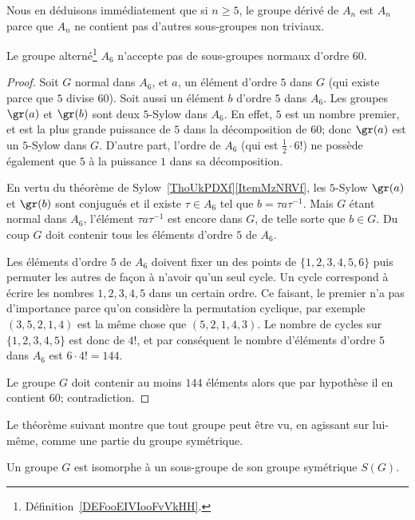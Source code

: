Nous en déduisons immédiatement que si \( n\geq 5\), le groupe dérivé de \( A_n\) est \( A_n\) parce que \( A_n\) ne contient pas d'autres sous-groupes non triviaux.

\begin{lemma}       \label{LEMooICEHooGSSpkq}
	Le groupe alterné\footnote{Définition~\ref{DEFooEIVIooFvVkHH}.} \( A_6\) n'accepte pas de sous-groupes normaux d'ordre \( 60\).
\end{lemma}

\begin{proof}
	Soit \( G\) normal dans \( A_6\), et \( a\), un élément d'ordre \( 5\) dans \( G\) (qui existe parce que \( 5\) divise \( 60\)). Soit aussi un élément \( b\) d'ordre \( 5\) dans \( A_6\). Les groupes \( \gr(a)\) et \( \gr(b)\) sont deux \( 5\)-Sylow dans \( A_6\). En effet, \( 5\) est un nombre premier, et est la plus grande puissance de \( 5\) dans la décomposition de \( 60\); donc \( \gr(a)\) est un \( 5\)-Sylow dans \( G\). D'autre part, l'ordre de \( A_6\) (qui est \( \frac{ 1 }{2}\cdot 6!\)) ne possède également que \( 5\) à la puissance \( 1\) dans sa décomposition.

	En vertu du théorème de Sylow~\ref{ThoUkPDXf}\ref{ItemMzNRVf}, les \( 5\)-Sylow \( \gr(a)\) et \( \gr(b)\) sont conjugués et il existe \( \tau\in A_6\) tel que \( b=\tau a\tau^{-1}\). Mais \( G\) étant normal dans \( A_6\), l'élément \( \tau a\tau^{-1}\) est encore dans \( G\), de telle sorte que \( b\in G\). Du coup \( G\) doit contenir tous les éléments d'ordre \( 5\) de \( A_6\).

	Les éléments d'ordre \( 5\) de \( A_6\) doivent fixer un des points de \( \{ 1,2,3,4,5,6 \}\) puis permuter les autres de façon à n'avoir qu'un seul cycle. Un cycle correspond à écrire les nombres \( 1,2,3,4,5\) dans un certain ordre. Ce faisant, le premier n'a pas d'importance parce qu'on considère la permutation cyclique, par exemple \( (3,5,2,1,4)\) est la même chose que \( (5,2,1,4,3)\). Le nombre de cycles sur \( \{ 1,2,3,4,5 \}\) est donc de \( 4!\), et par conséquent le nombre d'éléments d'ordre \( 5\) dans \( A_6\) est \( 6\cdot 4!=144\).

	Le groupe \( G\) doit contenir au moins \( 144\) éléments alors que par hypothèse il en contient \( 60\); contradiction.
\end{proof}

Le théorème suivant montre que tout groupe peut être vu, en agissant sur lui-même, comme une partie du groupe symétrique.
\begin{theorem}
	Un groupe \( G\) est isomorphe à un sous-groupe de son groupe symétrique \( S(G)\).
\end{theorem}


